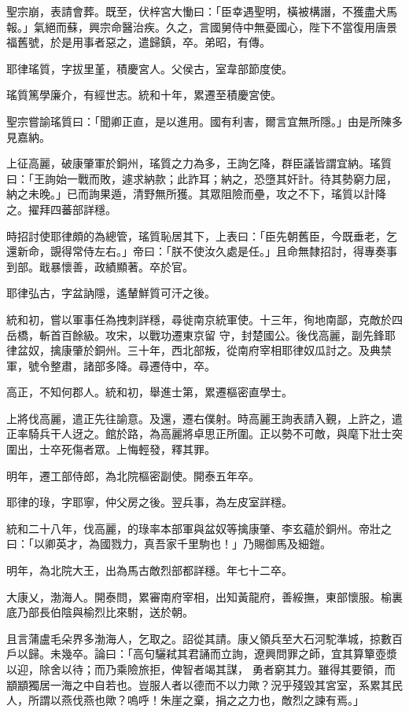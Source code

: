 \begin{pinyinscope}
 聖宗崩，表請會葬。既至，伏梓宮大慟曰：「臣幸遇聖明，橫被構譖，不獲盡犬馬報。」氣絕而蘇，興宗命醫治疾。久之，言國舅侍中無憂國心，陛下不當復用唐景福舊號，於是用事者惡之，遣歸鎮，卒。弟昭，有傳。



 耶律瑤質，字拔里堇，積慶宮人。父侯古，室韋部節度使。



 瑤質篤學廉介，有經世志。統和十年，累遷至積慶宮使。



 聖宗嘗諭瑤質曰：「聞卿正直，是以進用。國有利害，爾言宜無所隱。」由是所陳多見嘉納。



 上征高麗，破康肇軍於銅州，瑤質之力為多，王詢乞降，群臣議皆謂宜納。瑤質
 曰：「王詢始一戰而敗，遽求納款；此詐耳；納之，恐墮其奸計。待其勢窮力屈，納之未晚。」已而詢果遁，清野無所獲。其眾阻險而壘，攻之不下，瑤質以計降之。擢拜四蕃部詳穩。



 時招討使耶律頗的為總管，瑤質恥居其下，上表曰：「臣先朝舊臣，今既垂老，乞還新命，覬得常侍左右。」帝曰：「朕不使汝久處是任。」且命無隸招討，得專奏事到部。戢暴懷善，政績顯著。卒於官。



 耶律弘古，字盆訥隱，遙輦鮮質可汗之後。



 統和初，嘗以軍事任為拽刺詳穩，尋徙南京統軍使。十三年，徇地南鄙，克敵於四岳橋，斬首百餘級。攻宋，以戰功遷東京留
 守，封楚國公。後伐高麗，副先鋒耶律盆奴，擒康肇於銅州。三十年，西北部叛，從南府宰相耶律奴瓜討之。及典禁軍，號令整肅，諸部多降。尋遷侍中，卒。



 高正，不知何郡人。統和初，舉進士第，累遷樞密直學士。



 上將伐高麗，遣正先往諭意。及還，遷右僕射。時高麗王詢表請入覲，上許之，遣正率騎兵干人迓之。館於路，為高麗將卓思正所圍。正以勢不可敵，與麾下壯士突圍出，士卒死傷者眾。上悔輕發，釋其罪。



 明年，遷工部侍郎，為北院樞密副使。開泰五年卒。



 耶律的琭，字耶寧，仲父房之後。翌兵事，為左皮室詳穩。



 統和二十八年，伐高麗，的琭率本部軍與盆奴等擒康肇、李玄蘊於銅州。帝壯之曰：「以卿英才，為國戮力，真吾家千里駒也！」乃賜御馬及細鎧。



 明年，為北院大王，出為馬古敵烈部都詳穩。年七十二卒。



 大康乂，渤海人。開泰問，累審南府宰相，出知黃龍府，善綏撫，東部懷服。榆裏底乃部長伯陰與榆烈比來駙，送於朝。



 且言蒲盧毛朵界多渤海人，乞取之。詔從其請。康乂領兵至大石河駝準城，掠數百戶以歸。未幾卒。論曰：「高句驪弒其君誦而立詢，遼興問罪之師，宜其算簞壺漿以迎，除舍以待；而乃乘險旅拒，俾智者竭其謀，
 勇者窮其力。雖得其要領，而顓顓獨居一海之中自若也。豈服人者以德而不以力歟？況乎殘毀其宮室，系累其民人，所謂以燕伐燕也歟？嗚呼！朱崖之棄，捐之之力也，敵烈之諫有焉。」



\end{pinyinscope}